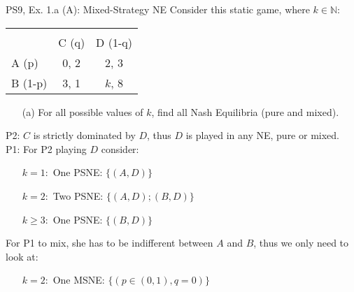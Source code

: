 \begin{frame}{PS9, Ex. 1.a (A): Mixed-Strategy NE}
      Consider this static game, where $k\in\mathbb{N}:$
      \vspace{-16pt}
      \begin{table}
        \begin{tabular}{l|c|c|}
          \multicolumn{1}{c}{} & \multicolumn{2}{c}{} \\
          \multicolumn{1}{c}{} & \multicolumn{1}{c}{C (q)} & \multicolumn{1}{c}{\color{blue}D (1-q)} \\\cline{2-3}
          A (p)   & 0, 2 & 2, \color{blue}3 \\\cline{2-3}
          B (1-p) & 3, 1 & $k$, \color{blue}8 \\\cline{2-3}
        \end{tabular}
      \end{table}
      \begin{itemize}
        \item[(a)] For all possible values of $k$, find all Nash Equilibria (pure and mixed).
      \end{itemize}
      P2: $C$ is strictly dominated by $D$, thus $D$ is played in any NE, pure or mixed.\\\medskip
      P1: For P2 playing $D$ consider:
      \begin{itemize}
        \item[$k=1:$] One PSNE: $\{(A,D)\}$
        \item[$k=2:$] Two PSNE: $\{(A,D);(B,D)\}$
        \item[$k\geq3:$] One PSNE: $\{(B,D)\}$
      \end{itemize}
      For P1 to mix, she has to be indifferent between $A$ and $B$, thus we only need to look at:
      \begin{itemize}
        \item[$k=2:$] One MSNE: $\{(p\in(0,1),q=0)\}$
      \end{itemize}
      \vfill\null
\end{frame}
